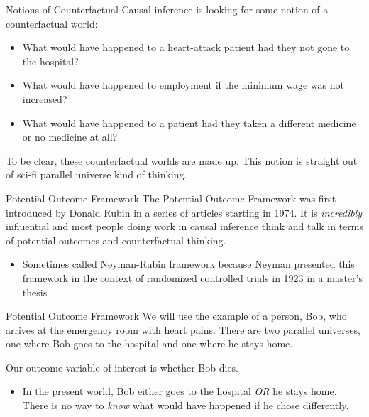 \documentclass[aspectratio=169,t,11pt,table]{beamer}
\begin{document}
\begin{frame}{Notions of Counterfactual}
  Causal inference is looking for some notion of a \alert{counterfactual} world:
  \begin{itemize}
    \item What would have happened to a heart-attack patient had they not gone to the hospital? 
    
    \item What would have happened to employment if the minimum wage was not increased? 
    
    \item What would have happened to a patient had they taken a different medicine or no medicine at all?
  \end{itemize}

  \bigskip
  To be clear, these counterfactual worlds are \alert{made up}. This notion is straight out of sci-fi parallel universe kind of thinking.
\end{frame}


\begin{frame}{Potential Outcome Framework}
  The \alert{Potential Outcome Framework} was first introduced by Donald Rubin in a series of articles starting in 1974. It is \emph{incredibly} influential and most people doing work in causal inference think and talk in terms of potential outcomes and counterfactual thinking.
  \begin{itemize}
    \item Sometimes called Neyman-Rubin framework because Neyman presented this framework in the context of randomized controlled trials in 1923 in a master's thesis
  \end{itemize}
% 
\end{frame}


\begin{frame}{Potential Outcome Framework}{}
  We will use the example of a person, Bob, who arrives at the emergency room with heart pains. 
  There are two parallel universes, one where Bob goes to the hospital and one where he stays home.

  \bigskip
  Our outcome variable of interest is whether Bob dies.
  \begin{itemize}
    \item In the present world, Bob either goes to the hospital \emph{OR} he stays home. 
    There is no way to \emph{know} what would have happened if he chose differently.
  \end{itemize}
\end{frame}
\end{document}
